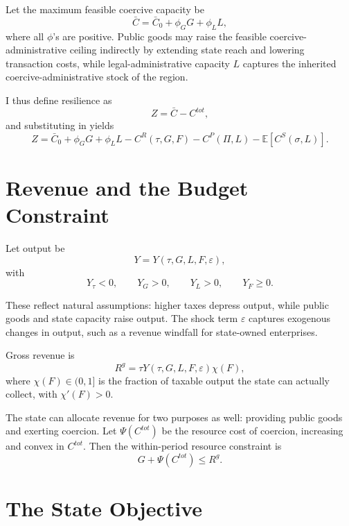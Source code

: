 \documentclass[12pt]{article}
\newcommand{\E}{\mathbb{E}}
\begin{document}
Let the maximum feasible coercive capacity be
\begin{equation}
\bar C = \bar C_0 + \phi_G G + \phi_L L,
\end{equation}
where all $\phi$'s are positive. Public goods may raise the feasible coercive-administrative ceiling indirectly by extending state reach and lowering transaction costs, while legal-administrative capacity $L$ captures the inherited coercive-administrative stock of the region.

I thus define resilience as
\begin{equation}
Z = \bar C - C^{tot},
\end{equation}
and substituting in yields
\begin{equation}
Z = \bar C_0 + \phi_G G + \phi_L L - C^R(\tau,G,F) - C^P(\Pi,L) - \E[C^S(\sigma,L)].
\end{equation}

\section{Revenue and the Budget Constraint}

Let output be
\begin{equation}
Y = Y(\tau,G,L,F,\varepsilon),
\end{equation}
with
\begin{equation}
Y_{\tau} < 0, \qquad Y_G > 0, \qquad Y_L > 0, \qquad Y_F \ge 0.
\end{equation}

These reflect natural assumptions: higher taxes depress output, while public goods and state capacity raise output. The shock term $\varepsilon$ captures exogenous changes in output, such as a revenue windfall for state-owned enterprises.

Gross revenue is
\begin{equation}
R^g = \tau Y(\tau,G,L,F,\varepsilon)\chi(F),
\end{equation}
where $\chi(F) \in (0,1]$ is the fraction of taxable output the state can actually collect, with $\chi'(F)>0$.

The state can allocate revenue for two purposes as well: providing public goods and exerting coercion. Let $\Psi(C^{tot})$ be the resource cost of coercion, increasing and convex in $C^{tot}$. Then the within-period resource constraint is
\begin{equation}
G + \Psi(C^{tot}) \le R^g.
\end{equation}

\section{The State Objective}
\end{document}
